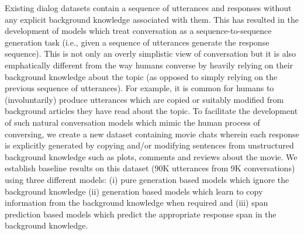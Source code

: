Existing dialog datasets contain a sequence of utterances and responses without any explicit background knowledge associated with them. This has resulted in the development of models which treat conversation as a sequence-to-sequence generation task (i.e., given a sequence of utterances generate the response sequence). This is not only an overly simplistic view of conversation but it is also emphatically different from the way humans converse by heavily relying on their background knowledge about the topic (as opposed to simply relying on the previous sequence of utterances). For example, it is common for humans to (involuntarily) produce utterances which are copied or suitably modified from background articles they have read about the topic. To facilitate the development of such natural conversation models which mimic the human process of conversing, we create a new dataset containing movie chats wherein each response is explicitly generated by copying and/or modifying sentences from unstructured background knowledge such as plots, comments and reviews about the movie.  We establish baseline results on this dataset (90K utterances from 9K conversations) using three different models: (i) pure generation based models which ignore the background knowledge (ii) generation based models which learn to copy information from the background knowledge when required and (iii) span prediction based models which predict the appropriate response span in the background knowledge.
